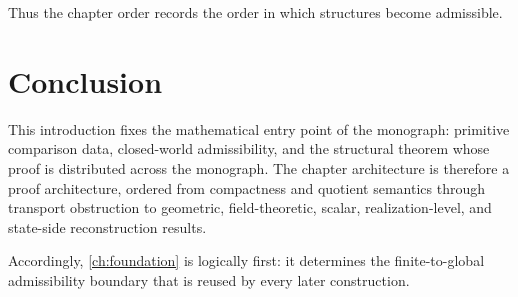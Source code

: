 Thus the chapter order records the order in which structures become
admissible.

\section{Conclusion}
\label{sec:introduction-conclusion}
This introduction fixes the mathematical entry point of the monograph:
primitive comparison data, closed-world admissibility, and the structural
theorem whose proof is distributed across the monograph.  The chapter
architecture is therefore a proof architecture, ordered from compactness
and quotient semantics through transport obstruction to geometric,
field-theoretic, scalar, realization-level, and state-side reconstruction
results.

Accordingly, \cref{ch:foundation} is logically first: it determines the
finite-to-global admissibility boundary that is reused by every later
construction.

\begin{chapterclosing}
\end{chapterclosing}
